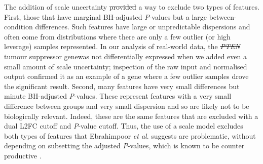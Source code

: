 \documentclass[10pt,letterpaper]{article}
\providecommand{\DIFaddtex}[1]{{\protect\color{blue}\uwave{#1}}} %
\providecommand{\DIFdeltex}[1]{{\protect\color{red}\sout{#1}}}                      %
\providecommand{\DIFaddbegin}{} %
\providecommand{\DIFaddend}{} %
\providecommand{\DIFdelbegin}{} %
\providecommand{\DIFdelend}{} %
\providecommand{\DIFadd}[1]{\texorpdfstring{\DIFaddtex{#1}}{#1}} %
\providecommand{\DIFdel}[1]{\texorpdfstring{\DIFdeltex{#1}}{}} %
\newcommand{\DIFscaledelfig}{0.5}
\newlength{\DIFdelgraphicswidth} %
\newlength{\DIFdelgraphicsheight} %
\newcommand{\DIFaddincludegraphics}[2][]{{\color{blue}\fbox{\DIFOincludegraphics[#1]{#2}}}} %
\newcommand{\DIFdelincludegraphics}[2][]{%
\sbox{\DIFdelgraphicsbox}{\DIFOincludegraphics[#1]{#2}}%
\settoboxwidth{\DIFdelgraphicswidth}{\DIFdelgraphicsbox} %
\settoboxtotalheight{\DIFdelgraphicsheight}{\DIFdelgraphicsbox} %
\scalebox{\DIFscaledelfig}{%
\parbox[b]{\DIFdelgraphicswidth}{\usebox{\DIFdelgraphicsbox}\\[-\baselineskip] \rule{\DIFdelgraphicswidth}{0em}}\llap{\resizebox{\DIFdelgraphicswidth}{\DIFdelgraphicsheight}{%
\setlength{\unitlength}{\DIFdelgraphicswidth}%
\begin{picture}(1,1)%
\thicklines\linethickness{2pt} %
{\color[rgb]{1,0,0}\put(0,0){\framebox(1,1){}}}%
{\color[rgb]{1,0,0}\put(0,0){\line( 1,1){1}}}%
{\color[rgb]{1,0,0}\put(0,1){\line(1,-1){1}}}%
\end{picture}%
}\hspace*{3pt}}} %
} %
\DeclareRobustCommand{\DIFaddbegin}{\DIFOaddbegin \let\includegraphics\DIFaddincludegraphics} %
\DeclareRobustCommand{\DIFaddend}{\DIFOaddend \let\includegraphics\DIFOincludegraphics} %
\DeclareRobustCommand{\DIFdelbegin}{\DIFOdelbegin \let\includegraphics\DIFdelincludegraphics} %
\DeclareRobustCommand{\DIFdelend}{\DIFOaddend \let\includegraphics\DIFOincludegraphics} %
\begin{document}
\DIFaddend The addition of scale uncertainty \DIFdelbegin \DIFdel{provided }\DIFdelend \DIFaddbegin \DIFadd{provides }\DIFaddend a way to exclude two types of features. First, those that have marginal BH-adjusted \textit{P}-values but a large between-condition differences. Such features have large or unpredictable dispersions and often come from distributions where there are only a few outlier (or high leverage) samples represented. In our analysis of real-world data, the \DIFdelbegin \textit{\DIFdel{PTEN}} %
\DIFdelend tumour suppressor gene\DIFaddbegin \DIFadd{, }\textit{\DIFadd{PTEN}}\DIFadd{, }\DIFaddend was not differentially expressed when we added even a small amount of scale uncertainty; inspection of the raw input and normalised output confirmed it as an example of a gene where a few outlier samples drove the significant result. Second, many features have very small differences but minute BH-adjusted \textit{P}-values. These represent features with a very small difference between groups and very small dispersion and so are likely not to be biologically relevant. Indeed, these are the same features that are excluded with a dual L2FC cutoff and \textit{P}-value cutoff. Thus, the use of a scale model excludes both types of features that Ebrahimpoor \textit{et al}. \cite{ebrahimpoor_inflated_2021} suggests are problematic, without depending on subsetting the adjusted \textit{P}-values, which is known to be counter productive \cite{Goeman:2014aa, ebrahimpoor_inflated_2021}.
\end{document}

